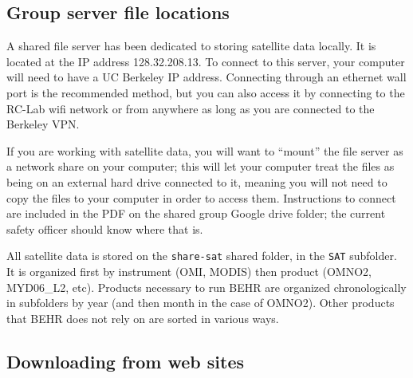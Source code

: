 \documentclass[12pt]{article}
\begin{document}
	\subsection{Group server file locations}\label{sec:file-server}
		A shared file server has been dedicated to storing satellite data locally. It is located at the IP address 128.32.208.13. To connect to this server, your computer will need to have a UC Berkeley IP address.  Connecting through an ethernet wall port is the recommended method, but you can also access it by connecting to the RC-Lab wifi network or from anywhere as long as you are connected to the Berkeley VPN.  
		
		If you are working with satellite data, you will want to ``mount'' the file server as a network share on your computer; this will let your computer treat the files as being on an external hard drive connected to it, meaning you will not need to copy the files to your computer in order to access them.  Instructions to connect are included in the PDF on the shared group Google drive folder; the current safety officer should know where that is.
		
		All satellite data is stored on the \texttt{share-sat} shared folder, in the \texttt{SAT} subfolder. It is organized first by instrument (OMI, MODIS) then product (OMNO2, MYD06\_L2, etc). Products necessary to run BEHR are organized chronologically in subfolders by year (and then month in the case of OMNO2). Other products that BEHR does not rely on are sorted in various ways.
	
	\subsection{Downloading from web sites}
	
\end{document}
